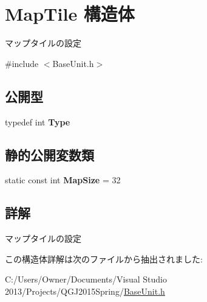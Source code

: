 \hypertarget{struct_map_tile}{}\section{Map\+Tile 構造体}
\label{struct_map_tile}


マップタイルの設定 




{\ttfamily \#include $<$Base\+Unit.\+h$>$}

\subsection*{公開型}
\begin{DoxyCompactItemize}
\item 
typedef int {\bfseries Type}\hypertarget{struct_map_tile_af57433aaf1f9a82f9beb8c8d9a95a272}{}\label{struct_map_tile_af57433aaf1f9a82f9beb8c8d9a95a272}

\end{DoxyCompactItemize}
\subsection*{静的公開変数類}
\begin{DoxyCompactItemize}
\item 
static const int {\bfseries Map\+Size} = 32\hypertarget{struct_map_tile_a9cf398e5445cc912dfb74d86dd13443d}{}\label{struct_map_tile_a9cf398e5445cc912dfb74d86dd13443d}

\end{DoxyCompactItemize}


\subsection{詳解}
マップタイルの設定



この構造体詳解は次のファイルから抽出されました\+:\begin{DoxyCompactItemize}
\item 
C\+:/\+Users/\+Owner/\+Documents/\+Visual Studio 2013/\+Projects/\+Q\+G\+J2015\+Spring/\hyperlink{_base_unit_8h}{Base\+Unit.\+h}\end{DoxyCompactItemize}
